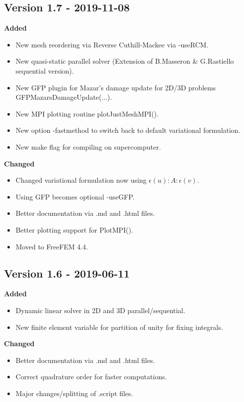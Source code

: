 \subsection{Version 1.7 - 2019-11-08}

\textbf{Added}
\begin{itemize}
 \item New  mesh reordering via Reverse Cuthill-Mackee via {\ttfamily -useRCM}. 
 \item New quasi-static parallel solver (Extension of B.Masseron \& G.Rastiello sequential version).
 \item New GFP plugin for Mazar's damage update for 2D/3D problems {\ttfamily GFPMazarsDamageUpdate(...)}.
 \item New MPI plotting routine {\ttfamily plotJustMeshMPI()}.
 \item New option {\ttfamily -fastmethod} to switch back to default variational formulation.
 \item New  make flag for compiling on supercomputer. 
\end{itemize}

\textbf{Changed}
\begin{itemize}
 \item Changed variational formulation now using $\epsilon(u):A:\epsilon(v)$.
 \item Using GFP becomes optional {\ttfamily -useGFP}.
 \item Better documentation via {\ttfamily .md} and {\ttfamily .html} files.
 \item Better plotting support for {\ttfamily PlotMPI()}.
 \item Moved to FreeFEM 4.4.
\end{itemize}


\subsection{Version 1.6 - 2019-06-11}

\textbf{Added}
\begin{itemize}
 \item Dynamic linear solver in 2D and 3D  parallel/sequential.
 \item New finite element variable for partition of unity for fixing integrals.
\end{itemize}


\textbf{Changed}
\begin{itemize}
 \item Better documentation via {\ttfamily.md} and {\ttfamily.html} files.
 \item Correct quadrature order for faster computations.
 \item Major changes/splitting of {\ttfamily.script} files.
\end{itemize}

